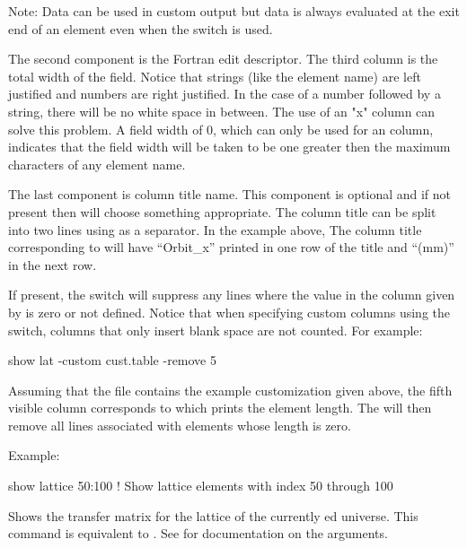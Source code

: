{{{\begin{description}
Note: Data can be used in custom output but data is always evaluated at
the exit end of an element even when the  switch is used.

The second component is the Fortran edit descriptor. The third column
is the total width of the field. Notice that strings (like the element
name) are left justified and numbers are right justified. In the case
of a number followed by a string, there will be no white space in
between. The use of an "x" column can solve this problem. A field
width of 0, which can only be used for an  column,
indicates that the field width will be taken to be one greater then
the maximum characters of any element name.

The last component is column title name. This component is optional
and if not present then \tao will choose something appropriate. The
column title can be split into two lines using  as a separator.
In the example above, The column title corresponding to  
will have ``Orbit_x'' printed in one row of the title and ``(mm)'' in the next row.

If present, the  switch will
suppress any lines where the value in the column given by  is zero or not defined. Notice that when specifying custom columns using the
 switch, columns that only insert blank space
are not counted. For example:
\begin{example}
  show lat -custom cust.table -remove 5
\end{example}
Assuming that the file  contains the example
customization given above, the fifth visible column corresponds to
 which prints the element length. The 
will then remove all lines associated with elements whose length is
zero.

Example:
\begin{example}
  show lattice 50:100         ! Show lattice elements with index 50 through 100
\end{example}


\item[show matrix \{-s\} \{loc1 \{loc2\}\}] \Newline

\vskip -0.2in

Shows the transfer matrix for the  lattice of the currently
ed universe. This command is equivalent to . See  for documentation 
on the  arguments.


\end{description}}}}
